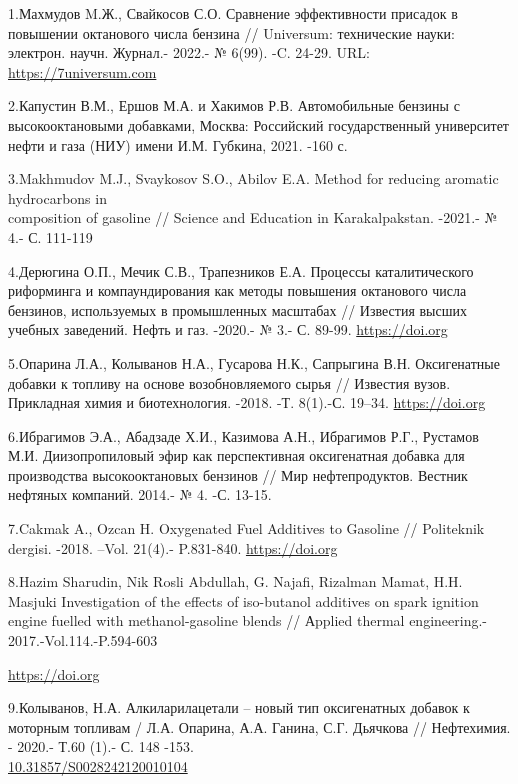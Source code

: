\begin{references}
1.Махмудов M.Ж., Свайкосов С.О. Сравнение эффективности присадок в
повышении октанового числа бензина // Universum: технические науки:
электрон. научн. Журнал.- 2022.- № 6(99). -C. 24-29. URL:
\href{https://7universum.com/ru/tech/archive/item/14001}{https://7universum.com}

2.Капустин В.М., Ершов М.А. и Хакимов Р.В. Автомобильные бензины с
высокооктановыми добавками, Москва: Российский государственный
университет нефти и газа (НИУ) имени И.М. Губкина, 2021. -160 с.

3.Makhmudov M.J., Svaykosov S.O., Abilov E.A. Method for reducing
aromatic hydrocarbons in \\composition of gasoline // Science and
Education in Karakalpakstan. -2021.- № 4.- С. 111-119

4.Дерюгина О.П., Мечик С.В., Трапезников Е.А. Процессы каталитического
риформинга и компаундирования как методы повышения октанового числа
бензинов, используемых в промышленных масштабах // Известия высших
учебных заведений. Нефть и газ. -2020.- № 3.- С. 89-99.
\href{https://doi.org/10.31660/0445-0108-2020-3-89-99}{https://doi.org}

5.Опарина Л.А., Колыванов Н.А., Гусарова Н.К., Сапрыгина В.Н.
Оксигенатные добавки к топливу на основе возобновляемого сырья //
Известия вузов. Прикладная химия и биотехнология. -2018. -Т. 8(1).-С.
19--34. \href{https://doi.org/10.21285/2227-2925-2018-8-1-19-34}{https://doi.org}

6.Ибрагимов Э.А., Абадзаде Х.И., Казимова А.Н., Ибрагимов Р.Г., Рустамов
М.И. Диизопропиловый эфир как перспективная оксигенатная добавка для
производства высокооктановых бензинов // Мир нефтепродуктов. Вестник
нефтяных компаний. 2014.- № 4. -С. 13-15.

7.Cakmak A., Ozcan H. Oxygenated Fuel Additives to Gasoline //
Politeknik dergisi. -2018. --Vol. 21(4).- P.831-840.
\href{https://doi.org/10.2339/politeknik.457956}{https://doi.org}

8.Hazim Sharudin, Nik Rosli Abdullah, G. Najafi, Rizalman Mamat, H.H.
Masjuki Investigation of the effects of iso-butanol additives on spark
ignition engine fuelled with methanol-gasoline blends // Аpplied thermal
engineering.- 2017.-Vol.114.-P.594-603

\href{https://doi.org/10.1016/j.applthermaleng.2016.12.017}{https://doi.org}

9.Колыванов, Н.А. Алкиларилацетали -- новый тип оксигенатных добавок к
моторным топливам / Л.А. Опарина, А.А. Ганина, С.Г. Дьячкова //
Нефтехимия. - 2020.- Т.60 (1).- С. 148 -153.
\\\href{https://doi.org/10.31857/S0028242120010104}{10.31857/S0028242120010104}


\end{references}
